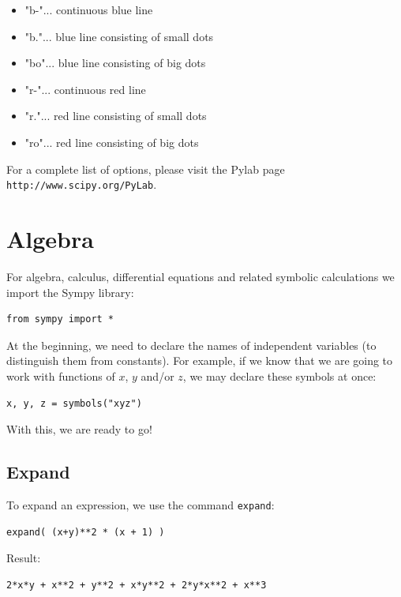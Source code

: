 \documentclass[article,A4,12pt]{llncs}
\begin{document}
\begin{itemize}
\item "b-"... continuous blue line
\item "b."... blue line consisting of small dots
\item "bo"... blue line consisting of big dots
\item "r-"... continuous red line
\item "r."... red line consisting of small dots
\item "ro"... red line consisting of big dots
\end{itemize}
For a complete list of options, please visit the Pylab page {\tt http://www.scipy.org/PyLab}.

\section{Algebra}

For algebra, calculus, differential equations and related symbolic calculations 
we import the Sympy library:

\begin{verbatim}
from sympy import *
\end{verbatim}
At the beginning, we need to declare the names of independent variables (to distinguish 
them from constants). For example, if we know that we are going to work with functions 
of $x$, $y$ and/or $z$, we may declare these symbols at once:
\begin{verbatim}
x, y, z = symbols("xyz")
\end{verbatim}
With this, we are ready to go!

\subsection{Expand}

To expand an expression, we use the command {\tt expand}:
\begin{verbatim}
expand( (x+y)**2 * (x + 1) )
\end{verbatim}
Result:
\begin{verbatim}
2*x*y + x**2 + y**2 + x*y**2 + 2*y*x**2 + x**3
\end{verbatim}
\end{document}
